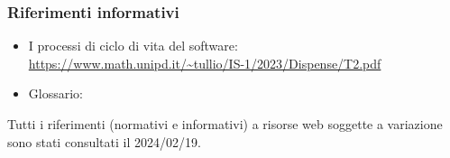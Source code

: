         \subsubsection{Riferimenti informativi}

        \begin{itemize}
            \item I processi di ciclo di vita del software: \\
            \url{https://www.math.unipd.it/~tullio/IS-1/2023/Dispense/T2.pdf}
            \item Glossario: \\
            \url{} %
        \end{itemize}

        Tutti i riferimenti (normativi e informativi) a risorse web soggette a variazione sono stati consultati il 2024/02/19.

